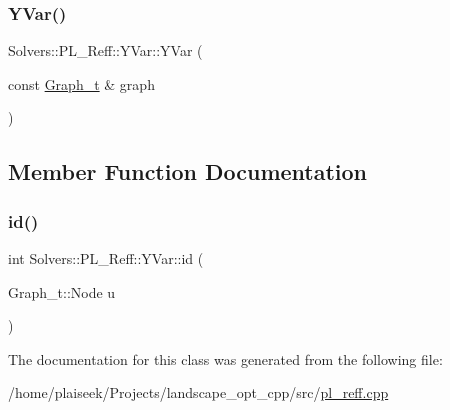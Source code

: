 \subsubsection{\texorpdfstring{Y\+Var()}{YVar()}}
{\footnotesize\ttfamily Solvers\+::\+P\+L\+\_\+\+Reff\+::\+Y\+Var\+::\+Y\+Var (\begin{DoxyParamCaption}\item[{const \hyperlink{pl__reff_8cpp_a65aea14f39d53b24df9910d54216d620}{Graph\+\_\+t} \&}]{graph }\end{DoxyParamCaption})\hspace{0.3cm}{\ttfamily [inline]}}



\subsection{Member Function Documentation}
\mbox{\label{class_solvers_1_1_p_l___reff_1_1_y_var_a96b14b9e99eb3440f2a754449154e37c}} 
\subsubsection{\texorpdfstring{id()}{id()}}
{\footnotesize\ttfamily int Solvers\+::\+P\+L\+\_\+\+Reff\+::\+Y\+Var\+::id (\begin{DoxyParamCaption}\item[{Graph\+\_\+t\+::\+Node}]{u }\end{DoxyParamCaption})\hspace{0.3cm}{\ttfamily [inline]}}



The documentation for this class was generated from the following file\+:\begin{DoxyCompactItemize}
\item 
/home/plaiseek/\+Projects/landscape\+\_\+opt\+\_\+cpp/src/\hyperlink{pl__reff_8cpp}{pl\+\_\+reff.\+cpp}\end{DoxyCompactItemize}
